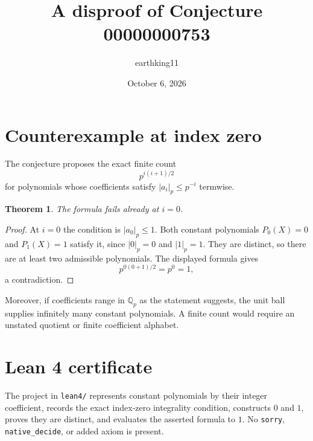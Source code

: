 \documentclass[11pt]{article}
\title{A disproof of Conjecture 00000000753}
\author{earthking11}
\date{October 6, 2026}
\newtheorem{theorem}{Theorem}
\begin{document}
\maketitle
\section*{Counterexample at index zero}
The conjecture proposes the exact finite count
\[
 p^{i(i+1)/2}
\]
for polynomials whose coefficients satisfy $|a_i|_p\le p^{-i}$ termwise.

\begin{theorem}
The formula fails already at $i=0$.
\end{theorem}
\begin{proof}
At $i=0$ the condition is $|a_0|_p\le1$.  Both constant polynomials
$P_0(X)=0$ and $P_1(X)=1$ satisfy it, since $|0|_p=0$ and $|1|_p=1$.
They are distinct, so there are at least two admissible polynomials.  The
displayed formula gives
\[
 p^{0(0+1)/2}=p^0=1,
\]
a contradiction.
\end{proof}

Moreover, if coefficients range in $\mathbb Q_p$ as the statement suggests,
the unit ball supplies infinitely many constant polynomials.  A finite count
would require an unstated quotient or finite coefficient alphabet.

\section*{Lean 4 certificate}
The project in \texttt{lean4/} represents constant polynomials by their
integer coefficient, records the exact index-zero integrality condition,
constructs $0$ and $1$, proves they are distinct, and evaluates the asserted
formula to $1$.  No \texttt{sorry}, \texttt{native\_decide}, or added axiom is
present.
\end{document}
